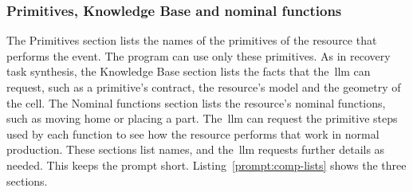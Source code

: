 \subsubsection{Primitives, Knowledge Base and nominal functions}\label{sec:comp-lists}

The Primitives section lists the names of the primitives of the resource that performs the event.
The program can use only these primitives. As in recovery task synthesis, the Knowledge Base
section lists the facts that the~\gls{llm} can request, such as a primitive's contract, the resource's
model and the geometry of the cell. The Nominal functions section lists the resource's nominal
functions, such as moving home or placing a part. The~\gls{llm} can request the primitive steps used by
each function to see how the resource performs that work in normal production. These sections
list names, and the~\gls{llm} requests further details as needed. This keeps the prompt short.
Listing~\ref{prompt:comp-lists} shows the three sections.

